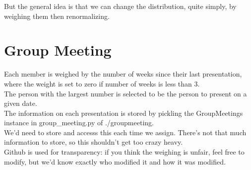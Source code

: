 \documentclass[letterpaper]{article}
\begin{document}
But the general idea is that we can change the distribution, quite simply, by weighing them then renormalizing.

\section{Group Meeting}
Each member is weighed by the number of weeks since their last presentation, where the weight is set to zero if number of weeks is less than 3.\\
The person with the largest number is selected to be the person to present on a given date.\\
The information on each presentation is stored by pickling the GroupMeetings instance in group\_meeting.py of ./groupmeeting. \\
We'd need to store and accesss this each time we assign. There's not that much information to store, so this shouldn't get too crazy heavy.\\
Github is used for transparency: if you think the weighing is unfair, feel free to modify, but we'd know exactly who modified it and how it was modified.\\
\end{document}

